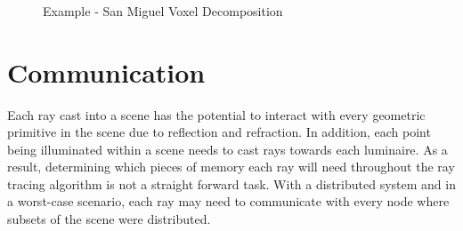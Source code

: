 \begin{figure}[!htb]
   \\
  
   \\
\endminipage\hfill
{}
   \\
\endminipage
\caption{Example - San Miguel Voxel Decomposition}
\label{fig:san_miguel_scene}
\end{figure}


\section{Communication} 
\label{sec:communication}
Each ray cast into a scene has the potential to interact with every geometric
primitive in the scene due to reflection and refraction.  In addition, each
point being illuminated within a scene needs to cast rays towards each
luminaire.  As a result, determining which pieces of memory each ray will need
throughout the ray tracing algorithm is not a straight forward task.  With a
distributed system and in a worst-case scenario, each ray may need to
communicate with every node where subsets of the scene were distributed.


